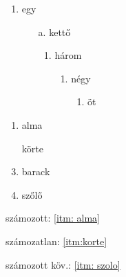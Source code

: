 \documentclass{article}
\begin{document}
\begin{enumerate}[series=elso]
\item egy
	\begin{enumerate}
	\item[a.] kettő
		\begin{enumerate}
		\item három
			\begin{enumerate}
			\item négy
				\begin{enumerate}
				\item öt
				\end{enumerate}
			\end{enumerate}
		\end{enumerate}
	\end{enumerate}
\end{enumerate}

\hulipsum[2]

\begin{enumerate}[resume=elso]
\item alma \label{itm: alma}
\item[\textbullet] körte \label{itm:korte}
\item barack 
\item szőlő \label{itm: szolo}
\end{enumerate}

számozott:
\ref{itm: alma}

számozatlan:
\ref{itm:korte}

számozott köv.:
\ref{itm: szolo}
\end{document}
